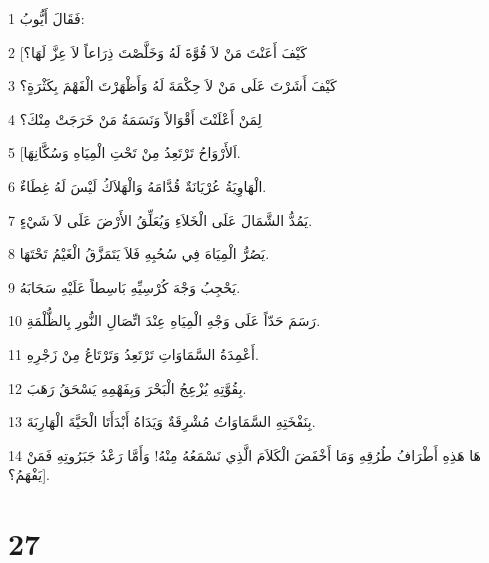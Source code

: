 \par 1 فَقَالَ أَيُّوبُ:
\par 2 [كَيْفَ أَعَنْتَ مَنْ لاَ قُوَّةَ لَهُ وَخَلَّصْتَ ذِرَاعاً لاَ عِزَّ لَهَا؟
\par 3 كَيْفَ أَشَرْتَ عَلَى مَنْ لاَ حِكْمَةَ لَهُ وَأَظْهَرْتَ الْفَهْمَ بِكَثْرَةٍ؟
\par 4 لِمَنْ أَعْلَنْتَ أَقْوَالاً وَنَسَمَةُ مَنْ خَرَجَتْ مِنْكَ؟
\par 5 [اَلأَرْوَاحُ تَرْتَعِدُ مِنْ تَحْتِ الْمِيَاهِ وَسُكَّانِهَا.
\par 6 الْهَاوِيَةُ عُرْيَانَةٌ قُدَّامَهُ وَالْهَلاَكُ لَيْسَ لَهُ غِطَاءٌ.
\par 7 يَمُدُّ الشَّمَالَ عَلَى الْخَلاَءِ وَيُعَلِّقُ الأَرْضَ عَلَى لاَ شَيْءٍ.
\par 8 يَصُرُّ الْمِيَاهَ فِي سُحُبِهِ فَلاَ يَتَمَزَّقُ الْغَيْمُ تَحْتَهَا.
\par 9 يَحْجِبُ وَجْهَ كُرْسِيِّهِ بَاسِطاً عَلَيْهِ سَحَابَهُ.
\par 10 رَسَمَ حَدّاً عَلَى وَجْهِ الْمِيَاهِ عِنْدَ اتِّصَالِ النُّورِ بِالظُّلْمَةِ.
\par 11 أَعْمِدَةُ السَّمَاوَاتِ تَرْتَعِدُ وَتَرْتَاعُ مِنْ زَجْرِهِ.
\par 12 بِقُوَّتِهِ يُزْعِجُ الْبَحْرَ وَبِفَهْمِهِ يَسْحَقُ رَهَبَ.
\par 13 بِنَفْخَتِهِ السَّمَاوَاتُ مُشْرِقَةٌ وَيَدَاهُ أَبْدَأَتَا الْحَيَّةَ الْهَارِبَةَ.
\par 14 هَا هَذِهِ أَطْرَافُ طُرُقِهِ وَمَا أَخْفَضَ الْكَلاَمَ الَّذِي نَسْمَعُهُ مِنْهُ! وَأَمَّا رَعْدُ جَبَرُوتِهِ فَمَنْ يَفْهَمُ؟].

\chapter{27}

